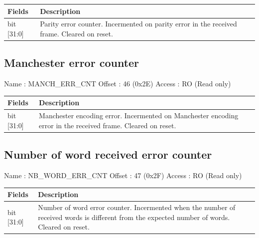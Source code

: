 \documentclass[11pt,a4paper]{article}
\begin{document}
\begin{table}[h!]
  \begin{tabularx}{\textwidth}{ l X }
    \hline
    \textbf{Fields} & \textbf{Description}\\
    \hline
    bit [31:0]  & Parity error counter. Incermented on parity error in the received frame. Cleared on reset. \\
    \hline
  \end{tabularx}
\end{table}

\subsection{Manchester error counter}

Name   : MANCH\_ERR\_CNT \newline
Offset : 46 (0x2E) \newline
Access : RO (Read only) \newline

\begin{table}[h!]
  \begin{tabularx}{\textwidth}{ l X }
    \hline
    \textbf{Fields} & \textbf{Description}\\
    \hline
    bit [31:0]  & Manchester encoding error. Incermented on Manchester encoding error in the received frame. Cleared on reset. \\
    \hline
  \end{tabularx}
\end{table}

\subsection{Number of word received error counter}

Name   : NB\_WORD\_ERR\_CNT \newline
Offset : 47 (0x2F) \newline
Access : RO (Read only) \newline

\begin{table}[h!]
  \begin{tabularx}{\textwidth}{ l X }
    \hline
    \textbf{Fields} & \textbf{Description}\\
    \hline
    bit [31:0]  & Number of word error counter. Incermented when the number of received words is different from the expected number of words. Cleared on reset. \\
    \hline
  \end{tabularx}
\end{table}
\end{document}
